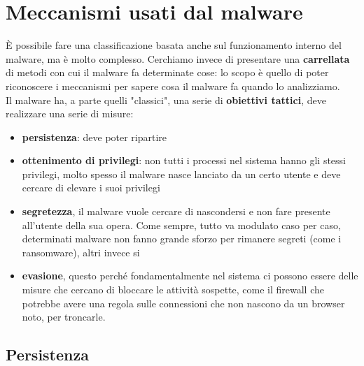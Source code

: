 \documentclass[12pt, oneside]{extbook}
\begin{document}
\section{Meccanismi usati dal malware}
È possibile fare una classificazione basata anche sul funzionamento interno del malware, ma è molto complesso. Cerchiamo invece di presentare una \textbf{\textsf{carrellata}} di metodi con cui il malware fa determinate cose: lo scopo è quello di poter riconoscere i meccanismi per sapere cosa il malware fa quando lo analizziamo.\\Il malware ha, a parte quelli "classici", una serie di \textbf{obiettivi tattici}, deve realizzare una serie di misure:
\begin{itemize}
	\item \textbf{persistenza}: deve poter ripartire
	\item \textbf{ottenimento di privilegi}: non tutti i processi nel sistema hanno gli stessi privilegi, molto spesso il malware nasce lanciato da un certo utente e deve cercare di elevare i suoi privilegi
	\item \textbf{segretezza}, il malware vuole cercare di nascondersi e non fare presente all'utente della sua opera. Come sempre, tutto va modulato caso per caso, determinati malware non fanno grande sforzo per rimanere segreti (come i ransomware), altri invece si
	\item \textbf{evasione}, questo perché fondamentalmente nel sistema ci possono essere delle misure che cercano di bloccare le attività sospette, come il firewall che potrebbe avere una regola sulle connessioni che non nascono da un browser noto, per troncarle.
\end{itemize}
\subsection{Persistenza}
\end{document}
